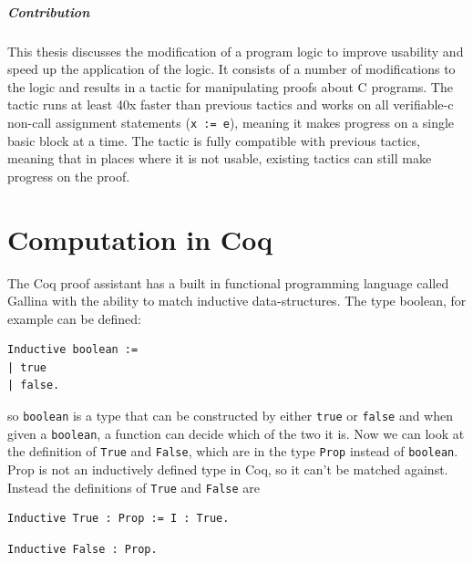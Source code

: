 \documentclass{puthesis}
\begin{document}
\paragraph{Contribution}
This thesis discusses the modification of a program logic to improve
usability and speed up the application of the logic. It consists of a
number of modifications to the logic and results in a tactic for
manipulating proofs about C programs. The tactic runs at least 40x
faster than previous tactics and works on all verifiable-c non-call
assignment statements (\lstinline|x := e|), meaning it makes progress
on a single basic block at a time. The tactic is fully compatible with
previous tactics, meaning that in places where it is not usable,
existing tactics can still make progress on the proof.

\chapter{Computation in Coq}
\label{ch:computation}
The Coq proof assistant has a built in functional programming language
called Gallina with the ability to match inductive data-structures. The type
boolean, for example can be defined:

\begin{verbatim}
Inductive boolean :=
| true
| false.
\end{verbatim}

so \lstinline|boolean| is a type that can be constructed by either
\lstinline|true| or \lstinline|false| and when given a
\lstinline|boolean|, a function can decide which of the two it is. Now
we can look at the definition of \lstinline|True| and
\lstinline|False|, which are in the type
\lstinline|Prop| instead of \lstinline|boolean|. Prop is not an
inductively defined type in Coq, so it can't be matched
against. Instead the definitions of \lstinline|True| and \lstinline|False|
are

\begin{verbatim}
Inductive True : Prop := I : True.
\end{verbatim}
\begin{verbatim}
Inductive False : Prop.
\end{verbatim}
\end{document}
